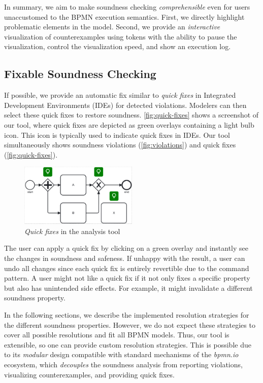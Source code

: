 \documentclass[runningheads]{llncs}
\begin{document}
In summary, we aim to make soundness checking \textit{comprehensible} even for users unaccustomed to the BPMN execution semantics.
First, we directly highlight problematic elements in the model.
Second, we provide an \textit{interactive} visualization of counterexamples using tokens with the ability to pause the visualization, control the visualization speed, and show an execution log.

\subsection{Fixable Soundness Checking} \label{subsec:fixable-checking}

If possible, we provide an automatic fix similar to \textit{quick fixes} in Integrated Development Environments (IDEs) for detected violations.
Modelers can then select these quick fixes to restore soundness.
\autoref{fig:quick-fixes} shows a screenshot of our tool, where quick fixes are depicted as green overlays containing a light bulb icon.
This icon is typically used to indicate quick fixes in IDEs.
Our tool simultaneously shows soundness violations (\autoref{fig:violations}) and quick fixes (\autoref{fig:quick-fixes}).

\begin{figure}[ht]
	\centering
	\includegraphics[width=0.5\textwidth]{images/quickfixes}
	\caption{\textit{Quick fixes} in the analysis tool}
	\label{fig:quick-fixes}
\end{figure}

The user can apply a quick fix by clicking on a green overlay and instantly see the changes in soundness and safeness.
If unhappy with the result, a user can undo all changes since each quick fix is entirely revertible due to the command pattern.
A user might not like a quick fix if it not only fixes a specific property but also has unintended side effects.
For example, it might invalidate a different soundness property.

In the following sections, we describe the implemented resolution strategies for the different soundness properties.
However, we do not expect these strategies to cover all possible resolutions and fit all BPMN models.
Thus, our tool is extensible, so one can provide custom resolution strategies.
This is possible due to its \textit{modular} design compatible with standard mechanisms of the \textit{bpmn.io} ecosystem, which \textit{decouples} the soundness analysis from reporting violations, visualizing counterexamples, and providing quick fixes.
\end{document}
